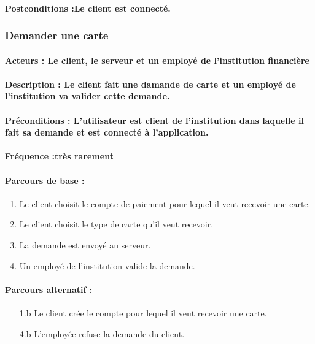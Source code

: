 \documentclass[../annexe.tex]{subfiles}
\begin{document}
\paragraph{Postconditions :Le client est connecté.}

\subsubsection{Demander une carte}
\paragraph{Acteurs : Le client, le serveur et un employé de l'institution financière}
\paragraph{Description : Le client fait une damande de carte et un employé de l'institution va valider cette demande.} 
\paragraph{Préconditions : L'utilisateur est client de l'institution dans laquelle il fait sa demande et est connecté à l'application.}
\paragraph{Fréquence :très rarement}
\paragraph{Parcours de base :}
\begin{enumerate}
	\item{Le client choisit le compte de paiement pour lequel il veut recevoir une carte.}
	\item{Le client choisit le type de carte qu'il veut recevoir.}
	\item{La demande est envoyé au serveur.}
	\item{Un employé de l'institution valide la demande.}
\end{enumerate}
\paragraph{Parcours alternatif :}
\begin{itemize}
	\item[1.b]{Le client crée le compte pour lequel il veut recevoir une carte.}
	\item[4.b]{L'employée refuse la demande du client.}
\end{itemize}
\end{document}

